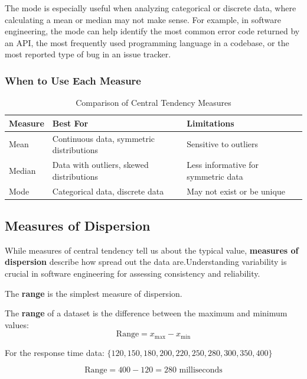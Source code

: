 The mode is especially useful when analyzing categorical or discrete data, where calculating a mean or median may not make sense. For example, in software engineering, the mode can help identify the most common error code returned by an API, the most frequently used programming language in a codebase, or the most reported type of bug in an issue tracker.

\subsubsection*{When to Use Each Measure}

\begin{table}[htbp]
\centering
\renewcommand{\arraystretch}{1.4}
\begin{tabular}{|l|l|l|}
\hline
\textbf{Measure} & \textbf{Best For} & \textbf{Limitations} \\
\hline
Mean & Continuous data, symmetric distributions & Sensitive to outliers \\
\hline
Median & Data with outliers, skewed distributions & Less informative for symmetric data \\
\hline
Mode & Categorical data, discrete data & May not exist or be unique \\
\hline
\end{tabular}
\caption{Comparison of Central Tendency Measures}
\label{tab:central_tendency}
\end{table}

\subsection*{Measures of Dispersion}

While measures of central tendency tell us about the typical value, \textbf{measures of dispersion} describe how spread out the data are.Understanding variability is crucial in software engineering for assessing consistency and reliability.

The \textbf{range} is the simplest measure of dispersion.

\begin{definition}[Range]
The \textbf{range} of a dataset is the difference between the maximum and minimum values:
\[
\text{Range} = x_{\max} - x_{\min}
\]
\end{definition}

\begin{example}

    For the response time data: $\{120, 150, 180, 200, 220, 250, 280, 300, 350, 400\}$

\[
\text{Range} = 400 - 120 = 280 \text{ milliseconds}
\]
\end{example}

